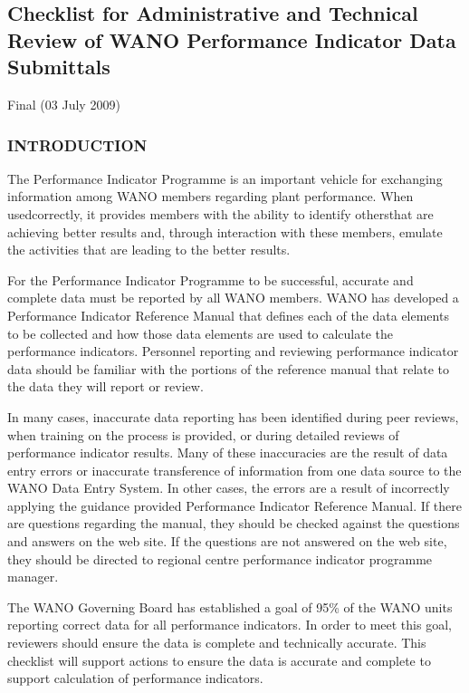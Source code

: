 \subsection{Checklist for Administrative
and Technical Review of
WANO Performance Indicator Data Submittals}

Final (03 July 2009)

\subsubsection{INTRODUCTION}

The Performance Indicator Programme is an important vehicle for exchanging
information among WANO members regarding plant performance. When
usedcorrectly, it provides members with the ability to identify
othersthat are achieving better results and, through interaction with
these members, emulate the activities that are leading to the better
results.

For the Performance Indicator Programme to be successful, accurate and
complete data must be reported by all WANO members. WANO has developed a
Performance Indicator Reference Manual that defines each of the data elements
to be collected and how those data elements are used to calculate the
performance indicators. Personnel reporting and reviewing performance indicator
data should be familiar with the portions of the reference manual that relate to the
data they will report or review.

In many cases, inaccurate data reporting has been identified during peer reviews,
when training on the process is provided, or during detailed reviews of
performance indicator results. Many of these inaccuracies are the result of data
entry errors or inaccurate transference of information from one data source to the
WANO Data Entry System. In other cases, the errors are a result of incorrectly
applying the guidance provided Performance Indicator Reference
Manual. If there are questions regarding the manual, they should be checked against the
questions and answers on the web site. If the questions are not answered on the
web site, they should be directed to regional centre performance indicator
programme manager.

The WANO Governing Board has established a goal of 95\% of the WANO units
reporting correct data for all performance indicators. In order to meet this goal,
reviewers should ensure the data is complete and technically accurate. This
checklist will support actions to ensure the data is accurate and complete to
support calculation of performance indicators.

